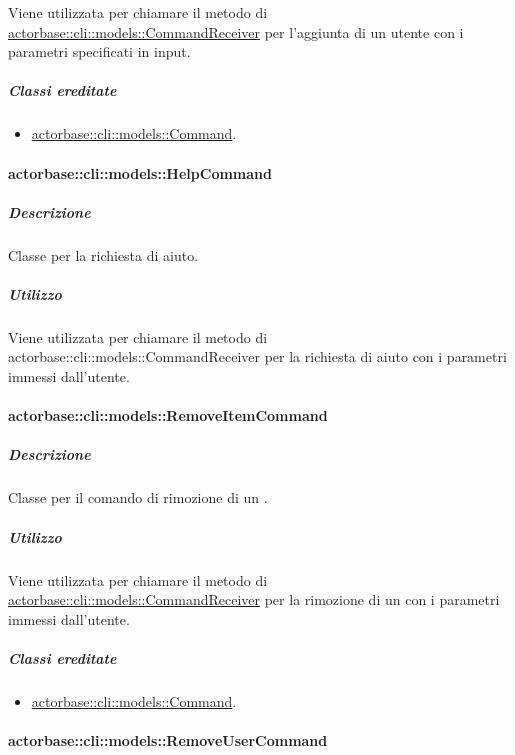 \documentclass{scalatekids-article}
\begin{document}
Viene utilizzata per chiamare il metodo di
\hyperref[sec:actorbase::cli::models::CommandReceiver]{actorbase::cli::models::CommandReceiver} per l'aggiunta di un utente con i
parametri specificati in input.

\subparagraph{Classi ereditate}

\begin{itemize}
\item \hyperref[sec:actorbase::cli::models::Command]{actorbase::cli::models::Command}.
\end{itemize}

\paragraph{actorbase::cli::models::HelpCommand}
\label{sec:actorbase::cli::models::HelpCommand}

\subparagraph{Descrizione}

Classe per la richiesta di aiuto.

\subparagraph{Utilizzo}

Viene utilizzata per chiamare il metodo di
actorbase::cli::models::CommandReceiver per la richiesta di aiuto con i
parametri immessi dall'utente.

\paragraph{actorbase::cli::models::RemoveItemCommand}
\label{sec:actorbase::cli::models::RemoveItemCommand}

\subparagraph{Descrizione}

Classe per il comando di rimozione di un .

\subparagraph{Utilizzo}

Viene utilizzata per chiamare il metodo di
\hyperref[sec:actorbase::cli::models::CommandReceiver]{actorbase::cli::models::CommandReceiver} per la rimozione di un 
con i parametri immessi dall'utente.

\subparagraph{Classi ereditate}

\begin{itemize}
\item \hyperref[sec:actorbase::cli::models::Command]{actorbase::cli::models::Command}.
\end{itemize}

\paragraph{actorbase::cli::models::RemoveUserCommand}
\label{sec:actorbase::cli::models::RemoveUserCommand}
\end{document}
